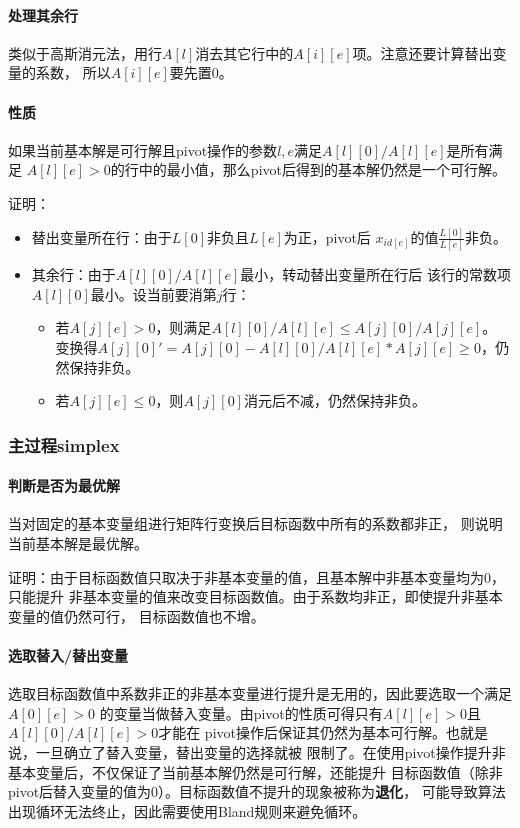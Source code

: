 \paragraph{处理其余行}
类似于高斯消元法，用行$A[l]$消去其它行中的$A[i][e]$项。注意还要计算替出变量的系数，
所以$A[i][e]$要先置0。
\paragraph{性质}
如果当前基本解是可行解且pivot操作的参数$l,e$满足$A[l][0]/A[l][e]$是所有满足
$A[l][e]>0$的行中的最小值，那么pivot后得到的基本解仍然是一个可行解。

证明：
\begin{itemize}
    \item 替出变量所在行：由于$L[0]$非负且$L[e]$为正，pivot后
    $x_{id[e]}$的值$\frac{L[0]}{L[e]}$非负。
    \item 其余行：由于$A[l][0]/A[l][e]$最小，转动替出变量所在行后
    该行的常数项$A[l][0]$最小。设当前要消第$j$行：
    \begin{itemize}
        \item 若$A[j][e]>0$，则满足$A[l][0]/A[l][e]\leq A[j][0]/A[j][e]$。
        变换得$A[j][0]'=A[j][0]-A[l][0]/A[l][e]*A[j][e]\geq 0$，仍然保持非负。
        \item 若$A[j][e]\leq 0$，则$A[j][0]$消元后不减，仍然保持非负。
    \end{itemize}
\end{itemize}

\subsubsection{主过程simplex}
\paragraph{判断是否为最优解}
当对固定的基本变量组进行矩阵行变换后目标函数中所有的系数都非正，
则说明当前基本解是最优解。

证明：由于目标函数值只取决于非基本变量的值，且基本解中非基本变量均为0，只能提升
非基本变量的值来改变目标函数值。由于系数均非正，即使提升非基本变量的值仍然可行，
目标函数值也不增。
\paragraph{选取替入/替出变量}
选取目标函数值中系数非正的非基本变量进行提升是无用的，因此要选取一个满足$A[0][e]>0$
的变量当做替入变量。由pivot的性质可得只有$A[l][e]>0$且$A[l][0]/A[l][e]>0$才能在
pivot操作后保证其仍然为基本可行解。也就是说，一旦确立了替入变量，替出变量的选择就被
限制了。在使用pivot操作提升非基本变量后，不仅保证了当前基本解仍然是可行解，还能提升
目标函数值（除非pivot后替入变量的值为0）。目标函数值不提升的现象被称为{\bfseries 退化}，
可能导致算法出现循环无法终止，因此需要使用Bland规则来避免循环。

